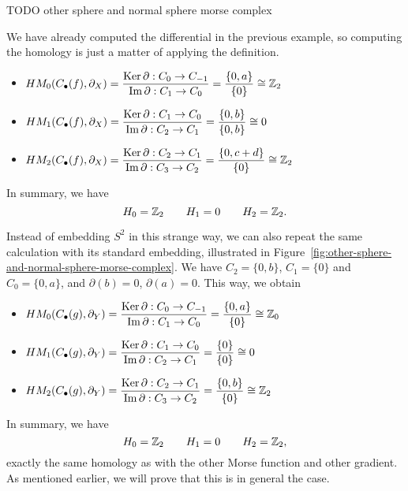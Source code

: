 \begin{marginfigure}
    \centering
    \caption{TODO other sphere and normal sphere morse complex}
    \label{fig:other-sphere-and-normal-sphere-morse-complex}
\end{marginfigure}

\begin{eg}
    We have already computed the differential in the previous example,
    so computing the homology is just a matter of applying the definition.
    \begin{itemize}
        \item $\HM[0]{f}{X} = \dfrac{\Ker \partial: C_0 \to  C_{-1}}{\Im \partial: C_1 \to  C_0} = \dfrac{\{0, a\} }{\{0\} } \cong \Z_2$
        \item $\HM[1]{f}{X} = \dfrac{\Ker \partial: C_1 \to  C_{0}}{\Im \partial: C_2 \to  C_1} = \dfrac{\{0, b\} }{\{0, b\} } \cong 0$
        \item $\HM[2]{f}{X} = \dfrac{\Ker \partial: C_2 \to  C_{1}}{\Im \partial: C_3 \to  C_2} = \dfrac{\{0, c+d\}}{\{ 0\}} \cong \Z_2$
    \end{itemize}
    In summary, we have
    \[
        H_0 = \Z_2 \qquad H_1 = 0 \qquad H_2 = \Z_2
    .\] 

    Instead of embedding $S^2$ in this strange way, we can also repeat the same calculation with its standard embedding, illustrated in Figure~\ref{fig:other-sphere-and-normal-sphere-morse-complex}.
    We have $ C_2 = \{0, b\} $, $ C_1 = \{0\} $  and $C_0 = \{0, a\}$, and $\partial(b) = 0$,  $\partial(a) = 0$.
    This way, we obtain
    \begin{itemize}
        \item $\HM[0]{g}{Y} = \dfrac{\Ker \partial: C_0 \to  C_{-1}}{\Im \partial: C_1 \to  C_0} = \dfrac{\{0, a\} }{\{0\} } \cong \Z_0$  
        \item $\HM[1]{g}{Y} = \dfrac{\Ker \partial: C_1 \to  C_{0}}{\Im \partial: C_2 \to  C_1} = \dfrac{\{0\} }{\{0\} } \cong 0$
        \item $\HM[2]{g}{Y} = \dfrac{\Ker \partial: C_2 \to  C_{1}}{\Im \partial: C_3 \to  C_2} = \dfrac{\{0, b\} }{\{0\} } \cong \Z_2$
    \end{itemize}
    In summary, we have 
    \[
    H_0 = \Z_2 \qquad H_1 = 0 \qquad H_2 = \Z_2
    ,\] 
    exactly the same homology as with the other Morse function and other gradient.
    As mentioned earlier, we will prove that this is in general the case.
\end{eg}
